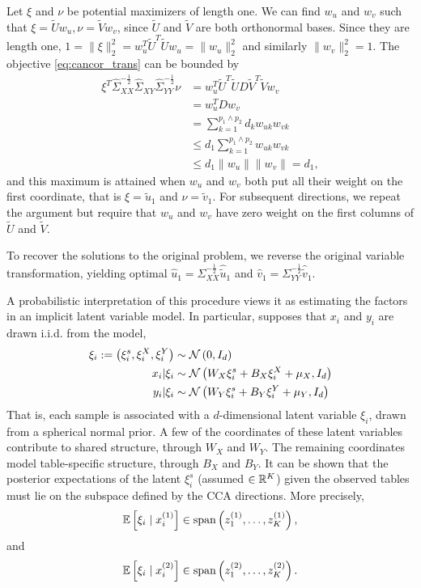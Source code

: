 \documentclass{article}
\begin{document}
Let $\xi$ and $\nu$ be potential maximizers of length one. We can find $w_{u}$
and $w_{v}$ such that $\xi = \tilde{U}w_{u}, \nu = \tilde{V}w_{v}$, since
$\tilde{U}$ and $\tilde{V}$ are both orthonormal bases. Since they are length
one, $1 = \|\xi\|^{2}_{2} = w_{u}^{T}\tilde{U}^{T}\tilde{U}w_{u} =
\|w_{u}\|_{2}^{2}$ and similarly $\|w_{v}\|_{2}^{2} = 1$. The objective
\ref{eq:cancor_trans} can be bounded by
\begin{align*}
\xi^{T}\hat{\Sigma}_{XX}^{-\frac{1}{2}}\hat{\Sigma}_{XY}\hat{\Sigma}_{YY}^{-\frac{1}{2}}\nu
&= w_{u}^{T}\tilde{U}^{T}\tilde{U}D\tilde{V}^{T}\tilde{V}w_{v} \\
&= w_{u}^{T}Dw_{v} \\
&= \sum_{k = 1}^{p_{1} \wedge p_{2}} d_{k}w_{uk}w_{vk} \\
&\leq d_{1} \sum_{k = 1}^{p_{1} \wedge p_{2}} w_{uk}w_{vk} \\
&\leq d_{1} \|w_{u}\|\|w_{v}\| = d_{1},
\end{align*}
and this maximum is attained when $w_{u}$ and $w_{v}$ both put all their weight
on the first coordinate, that is $\xi = \tilde{u}_{1}$ and $\nu =
\tilde{v}_{1}$. For subsequent directions, we repeat the argument but require
that $w_{u}$ and $w_{v}$ have zero weight on the first columns of $\tilde{U}$
and $\tilde{V}$.

To recover the solutions to the original problem, we reverse the original
variable transformation, yielding optimal $\hat{u}_{1} =
\Sigma_{XX}^{-\frac{1}{2}}\hat{\tilde{u}}_{1}$ and $\hat{v}_{1} =
\Sigma_{YY}^{-\frac{1}{2}}\hat{\tilde{v}}_{1}$.

A probabilistic interpretation of this procedure views it as estimating the
factors in an implicit latent variable model. In particular,
\citep{bach2005probabilistic} supposes that $x_{i}$ and $y_{i}$ are drawn i.i.d.
from the model,
\begin{align*}
  \xi_{i} := \left(\xi_{i}^{s}, \xi_{i}^{X}, \xi_{i}^{Y}\right) &\sim
  \mathcal{N}\left(0, I_{d}\right) \\
  x_{i} \vert \xi_{i} &\sim \mathcal{N}\left(W_{X}\xi_{i}^{s} + B_{X}\xi_{i}^{X} + \mu_{X},
  I_{d} \right) \\
  y_{i} \vert \xi_{i} &\sim \mathcal{N}\left(W_{Y}\xi_{i}^{s} +
  B_{Y}\xi_{i}^{Y} + \mu_{Y}, I_{d}\right)
\end{align*}
That is, each sample is associated with a $d$-dimensional latent variable
$\xi_{i}$, drawn from a spherical normal prior. A few of the coordinates of
these latent variables contribute to shared structure, through $W_{X}$ and
$W_{Y}$. The remaining coordinates model table-specific structure, through
$B_{X}$ and $B_{Y}$. It can be shown that the posterior expectations of the
latent $\xi_{i}^{s}$ (assumed $\in \mathbb{R}^{K}$) given the observed tables must
lie on the subspace defined by the CCA directions. More precisely,
\begin{align*}
  \mathbb{E}\left[{\xi_{i} \mid x_{i}^{(1)}}\right] \in \text{span}\left(z_{1}^{(1)},
    \dots, z_{K}^{(1)}\right),
\end{align*}
and
\begin{align*}
  \mathbb{E}\left[{\xi_{i} \mid x_{i}^{(2)}}\right] \in \text{span}\left(z_{1}^{(2)},
    \dots, z_{K}^{(2)}\right).
\end{align*}
\end{document}
